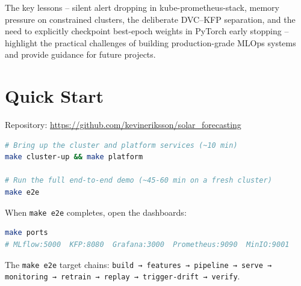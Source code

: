 \documentclass[11pt,a4paper]{article}
\begin{document}
The key lessons -- silent alert dropping in kube-prometheus-stack, memory pressure on constrained clusters, the deliberate DVC--KFP separation, and the need to explicitly checkpoint best-epoch weights in PyTorch early stopping -- highlight the practical challenges of building production-grade MLOps systems and provide guidance for future projects.

\appendix
\section{Quick Start}

Repository: \url{https://github.com/kevineriksson/solar\_forecasting}

\begin{lstlisting}[language=bash]
# Bring up the cluster and platform services (~10 min)
make cluster-up && make platform

# Run the full end-to-end demo (~45-60 min on a fresh cluster)
make e2e
\end{lstlisting}

When \texttt{make e2e} completes, open the dashboards:

\begin{lstlisting}[language=bash]
make ports
# MLflow:5000  KFP:8080  Grafana:3000  Prometheus:9090  MinIO:9001
\end{lstlisting}

\noindent The \texttt{make e2e} target chains: \texttt{build → features → pipeline → serve → monitoring → retrain → replay → trigger-drift → verify}.
\end{document}
